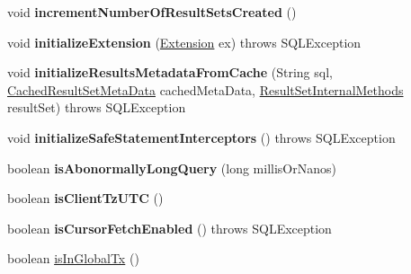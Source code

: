 \begin{DoxyCompactItemize}
void {\bfseries increment\+Number\+Of\+Result\+Sets\+Created} ()
\item 
\mbox{\label{classcom_1_1mysql_1_1jdbc_1_1_multi_host_my_s_q_l_connection_afed0066c63c9e886026fee366e7bedd0}} 
void {\bfseries initialize\+Extension} (\mbox{\hyperlink{interfacecom_1_1mysql_1_1jdbc_1_1_extension}{Extension}} ex)  throws S\+Q\+L\+Exception 
\item 
\mbox{\label{classcom_1_1mysql_1_1jdbc_1_1_multi_host_my_s_q_l_connection_a2ce8ae264342858befb6d65799d79c54}} 
void {\bfseries initialize\+Results\+Metadata\+From\+Cache} (String sql, \mbox{\hyperlink{classcom_1_1mysql_1_1jdbc_1_1_cached_result_set_meta_data}{Cached\+Result\+Set\+Meta\+Data}} cached\+Meta\+Data, \mbox{\hyperlink{interfacecom_1_1mysql_1_1jdbc_1_1_result_set_internal_methods}{Result\+Set\+Internal\+Methods}} result\+Set)  throws S\+Q\+L\+Exception 
\item 
\mbox{\label{classcom_1_1mysql_1_1jdbc_1_1_multi_host_my_s_q_l_connection_a6ee625468c062d1aabf8ea37d2ccfacc}} 
void {\bfseries initialize\+Safe\+Statement\+Interceptors} ()  throws S\+Q\+L\+Exception 
\item 
\mbox{\label{classcom_1_1mysql_1_1jdbc_1_1_multi_host_my_s_q_l_connection_a6b65a4eb389a95aaaf6fb6b1374f3f8b}} 
boolean {\bfseries is\+Abonormally\+Long\+Query} (long millis\+Or\+Nanos)
\item 
\mbox{\label{classcom_1_1mysql_1_1jdbc_1_1_multi_host_my_s_q_l_connection_ae038535fc2967b76667b338afcc7a848}} 
boolean {\bfseries is\+Client\+Tz\+U\+TC} ()
\item 
\mbox{\label{classcom_1_1mysql_1_1jdbc_1_1_multi_host_my_s_q_l_connection_a58cf77a959e359dd46ae2dd6f7ddd4ec}} 
boolean {\bfseries is\+Cursor\+Fetch\+Enabled} ()  throws S\+Q\+L\+Exception 
\item 
boolean \mbox{\hyperlink{classcom_1_1mysql_1_1jdbc_1_1_multi_host_my_s_q_l_connection_a7a8d4c611693701c71532835d4f1fffa}{is\+In\+Global\+Tx}} ()

\end{DoxyCompactItemize}
